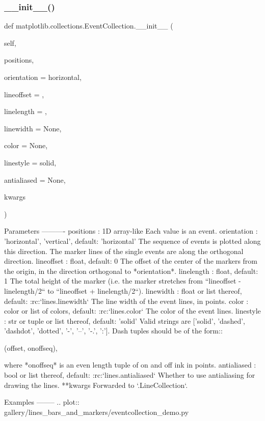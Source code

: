\subsubsection{\texorpdfstring{\+\_\+\+\_\+init\+\_\+\+\_\+()}{\_\_init\_\_()}}
{\footnotesize\ttfamily def matplotlib.\+collections.\+Event\+Collection.\+\_\+\+\_\+init\+\_\+\+\_\+ (\begin{DoxyParamCaption}\item[{}]{self,  }\item[{}]{positions,  }\item[{}]{orientation = {\ttfamily \textquotesingle{}horizontal\textquotesingle{}},  }\item[{}]{lineoffset = {},  }\item[{}]{linelength = {},  }\item[{}]{linewidth = {\ttfamily None},  }\item[{}]{color = {\ttfamily None},  }\item[{}]{linestyle = {\ttfamily \textquotesingle{}solid\textquotesingle{}},  }\item[{}]{antialiased = {\ttfamily None},  }\item[{}]{kwargs }\end{DoxyParamCaption})}

\begin{DoxyVerb}Parameters
----------
positions : 1D array-like
    Each value is an event.
orientation : {'horizontal', 'vertical'}, default: 'horizontal'
    The sequence of events is plotted along this direction.
    The marker lines of the single events are along the orthogonal
    direction.
lineoffset : float, default: 0
    The offset of the center of the markers from the origin, in the
    direction orthogonal to *orientation*.
linelength : float, default: 1
    The total height of the marker (i.e. the marker stretches from
    ``lineoffset - linelength/2`` to ``lineoffset + linelength/2``).
linewidth : float or list thereof, default: :rc:`lines.linewidth`
    The line width of the event lines, in points.
color : color or list of colors, default: :rc:`lines.color`
    The color of the event lines.
linestyle : str or tuple or list thereof, default: 'solid'
    Valid strings are ['solid', 'dashed', 'dashdot', 'dotted',
    '-', '--', '-.', ':']. Dash tuples should be of the form::

(offset, onoffseq),

    where *onoffseq* is an even length tuple of on and off ink
    in points.
antialiased : bool or list thereof, default: :rc:`lines.antialiased`
    Whether to use antialiasing for drawing the lines.
**kwargs
    Forwarded to `.LineCollection`.

Examples
--------
.. plot:: gallery/lines_bars_and_markers/eventcollection_demo.py
\end{DoxyVerb}
 

